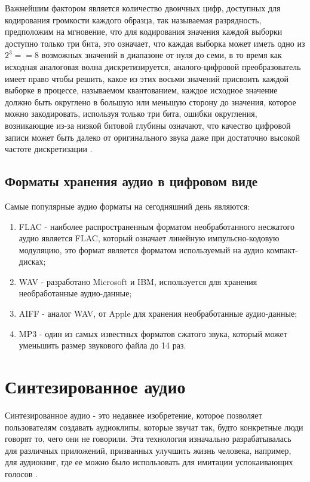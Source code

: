 Важнейшим фактором является количество двоичных цифр, доступных для кодирования громкости каждого образца, так называемая разрядность, предположим на мгновение, что для кодирования значения каждой выборки доступно только три бита, это означает, что каждая выборка может иметь одно из $2^{3} == 8$ возможных значений в диапазоне от нуля до семи, в то время как исходная аналоговая волна дискретизируется, аналого-цифровой преобразователь имеет право чтобы решить, какое из этих восьми значений присвоить каждой выборке в процессе, называемом квантованием, каждое исходное значение должно быть округлено в большую или меньшую сторону до значения, которое можно закодировать, используя только три бита, ошибки округления, возникающие из-за низкой битовой глубины означают, что качество цифровой записи может быть далеко от оригинального звука даже при достаточно высокой частоте дискретизации \cite{liu2023simple}.

\subsection{Форматы хранения аудио в цифровом виде}

Самые популярные аудио форматы на сегодняшний день являются:

\begin{enumerate}
    \item FLAC - наиболее распространенным форматом необработанного несжатого аудио является FLAC, который означает линейную импульсно-кодовую модуляцию, это формат является форматом используемый на аудио компакт-дисках;
    \item WAV - разработано Microsoft и IBM, используется для хранения необработанные аудио-данные;
    \item AIFF - аналог WAV, от Apple для хранения необработанные аудио-данные;
    \item MP3 - один из самых известных форматов сжатого звука, который может уменьшить размер звукового файла до 14 раз.
\end{enumerate}


\section{Синтезированное аудио}

Синтезированное аудио - это недавнее изобретение, которое позволяет пользователям создавать аудиоклипы, которые звучат так, будто конкретные люди говорят то, чего они не говорили. Эта технология изначально разрабатывалась для различных приложений, призванных улучшить жизнь человека, например, для аудиокниг, где ее можно было использовать для имитации успокаивающих голосов \cite{types-of-ad}.


